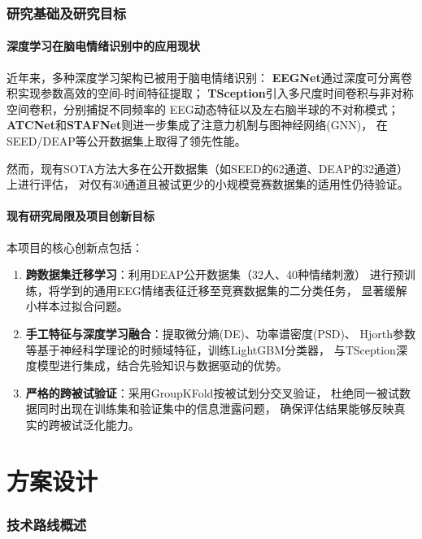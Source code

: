 \documentclass[12pt,a4paper]{ctexrep}
\begin{document}
\subsection{研究基础及研究目标}

\subsubsection{深度学习在脑电情绪识别中的应用现状}

近年来，多种深度学习架构已被用于脑电情绪识别：
\textbf{EEGNet}通过深度可分离卷积实现参数高效的空间-时间特征提取；
\textbf{TSception}引入多尺度时间卷积与非对称空间卷积，分别捕捉不同频率的
EEG动态特征以及左右脑半球的不对称模式；
\textbf{ATCNet}和\textbf{STAFNet}则进一步集成了注意力机制与图神经网络(GNN)，
在SEED/DEAP等公开数据集上取得了领先性能。

然而，现有SOTA方法大多在公开数据集（如SEED的62通道、DEAP的32通道）上进行评估，
对仅有30通道且被试更少的小规模竞赛数据集的适用性仍待验证。

\subsubsection{现有研究局限及项目创新目标}

本项目的核心创新点包括：
\begin{enumerate}
    \item \textbf{跨数据集迁移学习}：利用DEAP公开数据集（32人、40种情绪刺激）
          进行预训练，将学到的通用EEG情绪表征迁移至竞赛数据集的二分类任务，
          显著缓解小样本过拟合问题。
    \item \textbf{手工特征与深度学习融合}：提取微分熵(DE)、功率谱密度(PSD)、
          Hjorth参数等基于神经科学理论的时频域特征，训练LightGBM分类器，
          与TSception深度模型进行集成，结合先验知识与数据驱动的优势。
    \item \textbf{严格的跨被试验证}：采用GroupKFold按被试划分交叉验证，
          杜绝同一被试数据同时出现在训练集和验证集中的信息泄露问题，
          确保评估结果能够反映真实的跨被试泛化能力。
\end{enumerate}

\chapter{方案设计}

\subsection{技术路线概述}
\end{document}
